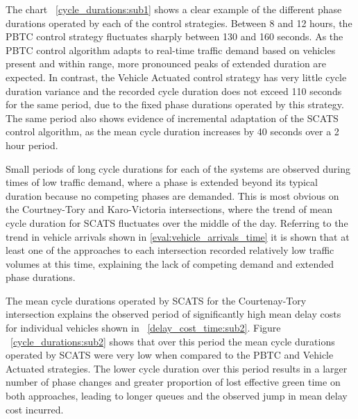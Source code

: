 {The chart ~\ref{cycle_durations:sub1} shows a clear example of the different phase durations operated by each of the control strategies. Between 8 and 12 hours, the PBTC control strategy fluctuates sharply between 130 and 160 seconds. As the PBTC control algorithm adapts to real-time traffic demand based on vehicles present and within range, more pronounced peaks of extended duration are expected. In contrast, the Vehicle Actuated control strategy has very little cycle duration variance and the recorded cycle duration does not exceed 110 seconds for the same period, due to the fixed phase durations operated by this strategy. The same period also shows evidence of incremental adaptation of the SCATS control algorithm, as the mean cycle duration increases by 40 seconds over a 2 hour period. 

Small periods of long cycle durations for each of the systems are observed during times of low traffic demand, where a phase is extended beyond its typical duration because no competing phases are demanded. This is most obvious on the Courtney-Tory and Karo-Victoria intersections, where the trend of mean cycle duration for SCATS fluctuates over the middle of the day. Referring to the trend in vehicle arrivals shown in \ref{eval:vehicle_arrivals_time} it is shown that at least one of the approaches to each intersection recorded relatively low traffic volumes at this time, explaining the lack of competing demand and extended phase durations.

The mean cycle durations operated by SCATS for the Courtenay-Tory intersection explains the observed period of significantly high mean delay costs for individual vehicles shown in ~\ref{delay_cost_time:sub2}. Figure ~\ref{cycle_durations:sub2} shows that over this period the mean cycle durations operated by SCATS were very low when compared to the PBTC and Vehicle Actuated strategies. The lower cycle duration over this period results in a larger number of phase changes and greater proportion of lost effective green time on both approaches, leading to longer queues and the observed jump in mean delay cost incurred. 

}
